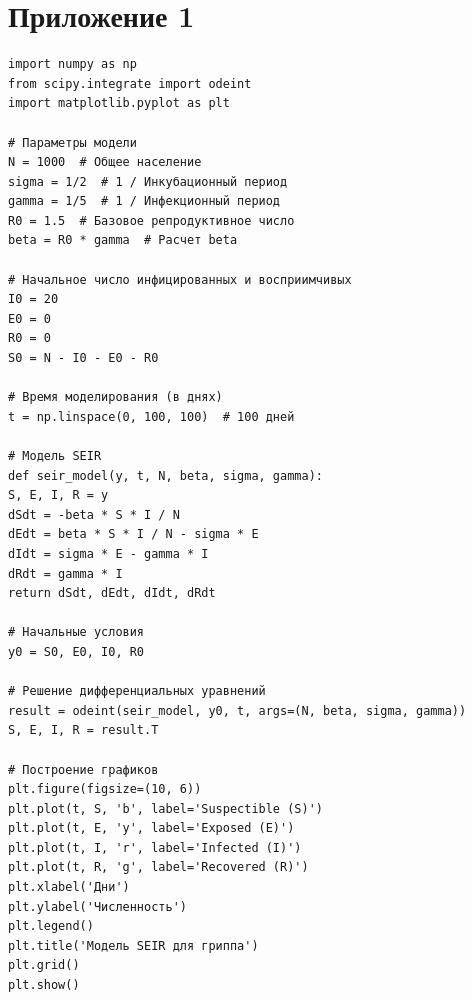 \documentclass[a4paper, 14pt]{extreport}
\numberwithin{equation}{section}
\begin{document}
	\section*{Приложение 1}
	\begin{verbatim}
import numpy as np
from scipy.integrate import odeint
import matplotlib.pyplot as plt

# Параметры модели
N = 1000  # Общее население
sigma = 1/2  # 1 / Инкубационный период
gamma = 1/5  # 1 / Инфекционный период
R0 = 1.5  # Базовое репродуктивное число
beta = R0 * gamma  # Расчет beta

# Начальное число инфицированных и восприимчивых
I0 = 20
E0 = 0
R0 = 0
S0 = N - I0 - E0 - R0

# Время моделирования (в днях)
t = np.linspace(0, 100, 100)  # 100 дней

# Модель SEIR
def seir_model(y, t, N, beta, sigma, gamma):
S, E, I, R = y
dSdt = -beta * S * I / N
dEdt = beta * S * I / N - sigma * E
dIdt = sigma * E - gamma * I
dRdt = gamma * I
return dSdt, dEdt, dIdt, dRdt

# Начальные условия
y0 = S0, E0, I0, R0

# Решение дифференциальных уравнений
result = odeint(seir_model, y0, t, args=(N, beta, sigma, gamma))
S, E, I, R = result.T

# Построение графиков
plt.figure(figsize=(10, 6))
plt.plot(t, S, 'b', label='Suspectible (S)')
plt.plot(t, E, 'y', label='Exposed (E)')
plt.plot(t, I, 'r', label='Infected (I)')
plt.plot(t, R, 'g', label='Recovered (R)')
plt.xlabel('Дни')
plt.ylabel('Численность')
plt.legend()
plt.title('Модель SEIR для гриппа')
plt.grid()
plt.show()
	\end{verbatim}
\end{document}
